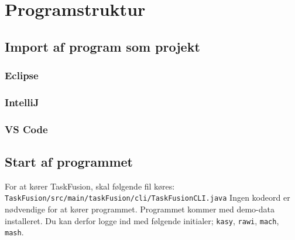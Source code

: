 \section{Programstruktur}\label{sec:struct}
\subsection{Import af program som projekt}
\subsubsection{Eclipse}
\subsubsection{IntelliJ}
\subsubsection{VS Code}

\subsection{Start af programmet}
For at kører TaskFusion, skal følgende fil køres: \texttt{TaskFusion/src/main/taskFusion/cli/TaskFusionCLI.java}
Ingen kodeord er nødvendige for at kører programmet.
Programmet kommer med demo-data installeret. Du kan derfor logge ind med følgende initialer; \texttt{kasy}, \texttt{rawi}, \texttt{mach}, \texttt{mash}.

